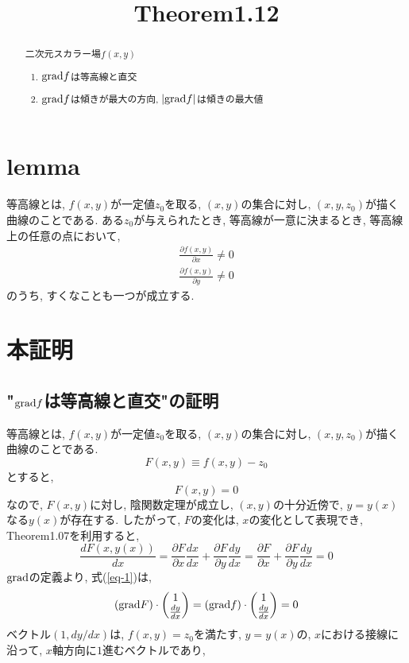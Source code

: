 \documentclass{jsarticle}
\title{Theorem1.12}
\newcommand*{\grad}{{\rm grad}}
\begin{document}
\maketitle

\begin{abstract}
  二次元スカラー場$f(x, y)$
  \begin{enumerate}
    \item $\grad f$は等高線と直交 \label{item-1}
    \item $\grad f$は傾きが最大の方向, $|\grad f |$は傾きの最大値
  \end{enumerate}
\end{abstract}

\section*{lemma}
等高線とは, $f(x, y)$が一定値$z_0$を取る, $(x, y)$の集合に対し, $(x, y, z_0)$が描く曲線のことである. 
ある$z_0$が与えられたとき, 等高線が一意に決まるとき, 等高線上の任意の点において, 
\begin{subequations}
  \begin{eqnarray}
    \frac{\partial f(x, y)}{\partial x} \neq 0 \\
    \frac{\partial f(x, y)}{\partial y} \neq 0
  \end{eqnarray}
\end{subequations}
のうち, すくなことも一つが成立する. 

\section*{本証明}
\subsection*{"$\grad f$は等高線と直交"の証明}
等高線とは, $f(x, y)$が一定値$z_0$を取る, $(x, y)$の集合に対し, $(x, y, z_0)$が描く曲線のことである. 
\[
  F(x, y) \equiv f(x, y) - z_0
\]
とすると, 
\[
  F(x, y) = 0
\]
なので, $F(x, y)$に対し, 陰関数定理が成立し, $(x, y)$の十分近傍で, $y = y(x)$なる$y(x)$が存在する. 
したがって, $F$の変化は, $x$の変化として表現でき, Theorem1.07を利用すると, 
\begin{equation}\label{eq-1}
  \frac{dF(x, y(x))}{dx} = \frac{\partial F}{\partial x}\frac{dx}{dx} + \frac{\partial F}{\partial y}\frac{dy}{dx}
  = \frac{\partial F}{\partial x} + \frac{\partial F}{\partial y}\frac{dy}{dx} = 0
\end{equation}
$\grad$の定義より, 式(\ref{eq-1})は, 
\begin{equation}
  (\grad F) 
  \cdot
  \begin{pmatrix}
    1 \\
    \frac{dy}{dx} \\
  \end{pmatrix}
  =
  (\grad f) 
  \cdot
  \begin{pmatrix}
    1 \\
    \frac{dy}{dx} \\
  \end{pmatrix}
  = 0
\end{equation}
ベクトル$(1, dy/dx)$は, $f(x, y) = z_0$を満たす, $y = y(x)$の, $x$における接線に沿って, $x$軸方向に$1$進むベクトルであり, 
\end{document}
